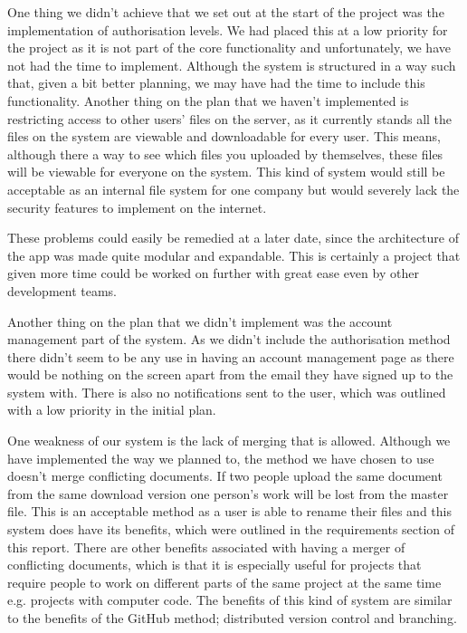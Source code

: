 \documentclass[11pt]{article}
\begin{document}
One thing we didn’t achieve that we set out at the start of the project was the implementation of authorisation levels. We had placed this at a low priority for the project as it is not part of the core functionality and unfortunately, we have not had the time to implement. Although the system is structured in a way such that, given a bit better planning, we may have had the time to include this functionality. Another thing on the plan that we haven’t implemented is restricting access to other users’ files on the server, as it currently stands all the files on the system are viewable and downloadable for every user. This means, although there a way to see which files you uploaded by themselves, these files will be viewable for everyone on the system. This kind of system would still be acceptable as an internal file system for one company but would severely lack the security features to implement on the internet.

These problems could easily be remedied at a later date, since the architecture of the app was made quite modular and expandable. This is certainly a project that given more time could be worked on further with great ease even by other development teams.

Another thing on the plan that we didn’t implement was the account management part of the system. As we didn’t include the authorisation method there didn’t seem to be any use in having an account management page as there would be nothing on the screen apart from the email they have signed up to the system with. There is also no notifications sent to the user, which was outlined with a low priority in the initial plan.

One weakness of our system is the lack of merging that is allowed. Although we have implemented the way we planned to, the method we have chosen to use doesn’t merge conflicting documents. If two people upload the same document from the same download version one person’s work will be lost from the master file. This is an acceptable method as a user is able to rename their files and this system does have its benefits, which were outlined in the requirements section of this report. There are other benefits associated with having a merger of conflicting documents, which is that it is especially useful for projects that require people to work on different parts of the same project at the same time e.g. projects with computer code. The benefits of this kind of system are similar to the benefits of the GitHub method; distributed version control and branching. 
\end{document}
